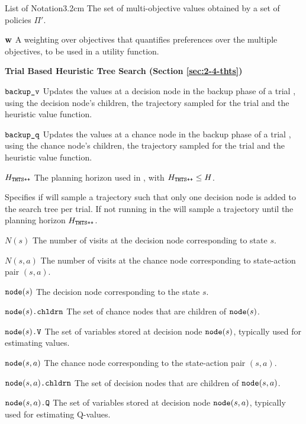 \begin{mclistof}{List of Notation}{3.2cm}
        The set of multi-objective values obtained by a set of policies $\Pi'$.
    \item[$\mathbf{w}$] 
        A weighting over objectives that quantifies preferences over the multiple objectives, to be used in a utility function.
    \\
    \item[{\parbox[t]{\textwidth}{
        \Large\textbf{Trial Based Heuristic Tree Search (Section \ref{sec:2-4-thts})}\hfill\hfill
      }}]
    \item[${\textnormal{\texttt{backup\_v}}}$]
        Updates the values at a decision node in the backup phase of a trial \thtspp, using the decision node's children, the trajectory sampled for the trial and the heuristic value function.
    \item[${\textnormal{\texttt{backup\_q}}}$] 
        Updates the values at a chance node in the backup phase of a trial \thtspp, using the chance node's children, the trajectory sampled for the trial and the heuristic value function.
    \item[$H_{{\textnormal{\texttt{THTS++}}}}$]
        The planning horizon used in \thtspp, with $H_{{\textnormal{\texttt{THTS++}}}}\leq H$.
    \item[\mctsmode] 
        Specifies if \thtspp\ewe will sample a trajectory such that only one decision node is added to the search tree per trial. If not running in \mctsmode\ewe the \thtspp\ewe will sample a trajectory until the planning horizon $H_{{\textnormal{\texttt{THTS++}}}}$.
    \item[$N(s)$]
        The number of visits at the decision node corresponding to state $s$.
    \item[$N(s,a)$]
        The number of visits at the chance node corresponding to state-action pair $(s,a)$.
    \item[${\textnormal{\texttt{node}}}(s)$] 
        The decision node corresponding to the state $s$.
    \item[${\textnormal{\texttt{node}}}(s){\textnormal{\texttt{.chldrn}}}$]
        The set of chance nodes that are children of ${\textnormal{\texttt{node}}}(s)$.
    \item[${{\textnormal{\texttt{node}}}(s)\textnormal{\texttt{.V}}}$]
        The set of variables stored at decision node ${\textnormal{\texttt{node}}}(s)$, typically used for estimating values.
    \item[${\textnormal{\texttt{node}}}(s,a)$] 
        The chance node corresponding to the state-action pair $(s,a)$.
    \item[${\textnormal{\texttt{node}}}(s,a){\textnormal{\texttt{.chldrn}}}$]
        The set of decision nodes that are children of ${\textnormal{\texttt{node}}}(s,a)$.
    \item[${{\textnormal{\texttt{node}}}(s,a)\textnormal{\texttt{.Q}}}$] 
        The set of variables stored at decision node ${\textnormal{\texttt{node}}}(s,a)$, typically used for estimating Q-values.

\end{mclistof}
